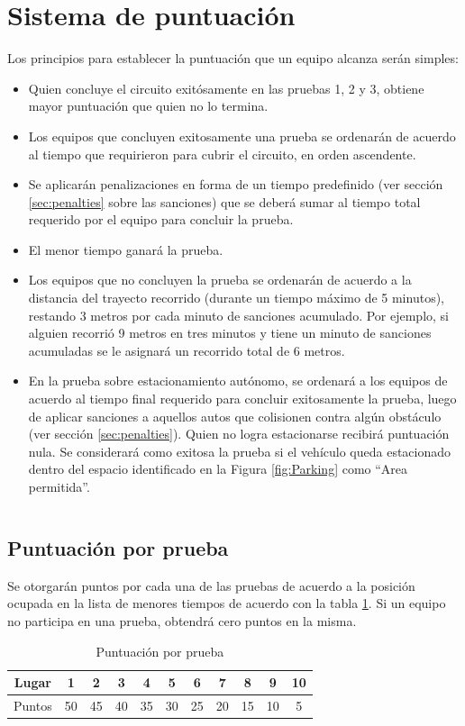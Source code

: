 \documentclass[letterpaper,12pt]{article}
\begin{document}
\section{Sistema de puntuación}
Los principios para establecer la puntuación que un equipo alcanza serán simples:
\begin{itemize}
\item Quien concluye el circuito exitósamente en las pruebas 1, 2 y 3, obtiene mayor puntuación que quien no lo termina.
\item Los equipos que concluyen exitosamente una prueba se ordenarán de acuerdo al tiempo que requirieron para cubrir el circuito, en orden ascendente.
\item Se aplicarán penalizaciones en forma de un tiempo predefinido (ver sección \ref{sec:penalties} sobre las sanciones) que se deberá sumar al tiempo total requerido por el equipo para concluir la prueba. 
\item El menor tiempo ganará la prueba.
\item Los equipos que no concluyen la prueba se ordenarán de acuerdo a la distancia del trayecto recorrido (durante un tiempo máximo de 5 minutos), restando 3 metros por cada minuto de sanciones acumulado. Por ejemplo, si alguien recorrió 9 metros en tres minutos y tiene un minuto de sanciones acumuladas se le asignará un recorrido total de 6 metros.
\item En la prueba sobre estacionamiento autónomo, se ordenará a los equipos de acuerdo al tiempo final requerido para concluir exitosamente la prueba, luego de aplicar sanciones a aquellos autos que colisionen contra algún obstáculo (ver sección \ref{sec:penalties}). Quien no logra estacionarse recibirá puntuación nula. Se considerará como exitosa la prueba si el vehículo queda estacionado dentro del espacio identificado en la Figura \ref{fig:Parking} como “Area permitida”.
\end{itemize}
\[\]
\[\]
\[\]
\subsection{Puntuación por prueba}
\label{sec:scoring}
Se otorgarán puntos por cada una de las pruebas de acuerdo a la posición ocupada en la lista de menores tiempos de acuerdo con la tabla \ref{tab:Scoring}. Si un equipo no participa en una prueba, obtendrá cero puntos en la misma.

\begin{table}[h!] 
  \centering
  \begin{tabular}{|c|c|c|c|c|c|c|c|c|c|c|}
    \hline
    Lugar &    1&   2&   3&   4&   5&   6&   7&   8&   9&10\\
    \hline
    Puntos & 50 & 45 & 40 & 35 & 30 & 25 & 20 & 15 & 10 & 5\\
    \hline
  \end{tabular}
  \caption{Puntuación por prueba}
  \label{tab:Scoring}
\end{table}
\end{document}
